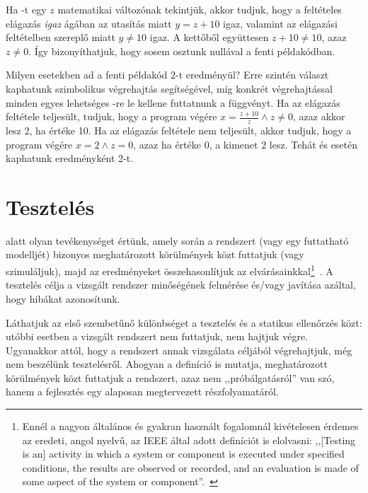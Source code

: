\begin{pelda}
Ha -t egy $z$ matematikai változónak tekintjük, akkor tudjuk, hogy a feltételes elágazás \emph{igaz} ágában az  utasítás miatt $y = z + 10$ igaz, valamint az elágazási feltételben szereplő  miatt $y \neq 10$ igaz. A kettőből együttesen $z + 10 \neq 10$, azaz $z \neq 0$. Így bizonyíthatjuk, hogy sosem osztunk nullával a fenti példakódban.
\end{pelda}

\begin{pelda}
Milyen esetekben ad a fenti példakód 2-t eredményül? Erre szintén választ kaphatunk szimbolikus végrehajtás segítségével, míg konkrét végrehajtással minden egyes lehetséges -re le kellene futtatnunk a függvényt. Ha az elágazás feltétele teljesült, tudjuk, hogy a program végére $x = \frac{z+10}{z} \wedge z \neq 0$, azaz  akkor lesz 2, ha  értéke 10. Ha az elágazás feltétele nem teljesült, akkor tudjuk, hogy a program végére $x = 2 \wedge z = 0$, azaz ha  értéke 0, a kimenet $2$ lesz. Tehát  és  esetén kaphatunk eredményként 2-t.
\end{pelda}




\section{Tesztelés}\label{sec:teszteles}

\begin{definicio}
 alatt olyan tevékenységet értünk, amely során a rendszert (vagy egy futtatható modelljét) bizonyos meghatározott körülmények közt futtatjuk (vagy szimuláljuk), majd az eredményeket összehasonlítjuk az elvárásainkkal\footnote{Ennél a nagyon általános és gyakran használt fogalomnál kivételesen érdemes az eredeti, angol nyelvű, az IEEE által adott definíciót is elolvasni: ,,[Testing is an] activity in which a system or component is executed under specified conditions, the results are observed or recorded, and an evaluation is made of some aspect of the system or component''.~\cite{IEEE-24765}}~\cite{IEEE-24765}. A tesztelés célja a vizsgált rendszer minőségének felmérése és/vagy javítása azáltal, hogy hibákat azonosítunk.
\end{definicio}

Láthatjuk az első szembetűnő különbséget a tesztelés és a statikus ellenőrzés közt: utóbbi esetben a vizsgált rendszert nem futtatjuk, nem hajtjuk végre. Ugyanakkor attól, hogy a rendszert annak vizsgálata céljából végrehajtjuk, még nem beszélünk tesztelésről. Ahogyan a definíció is mutatja, meghatározott körülmények közt futtatjuk a rendszert, azaz nem ,,próbálgatásról'' van szó, hanem a fejlesztés egy alaposan megtervezett részfolyamatáról.

